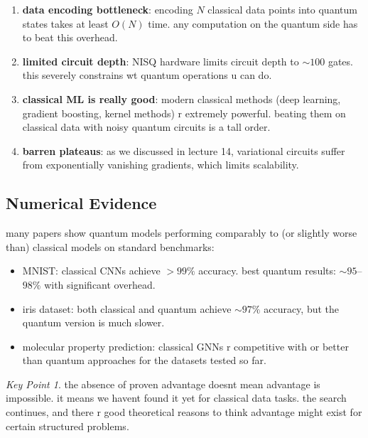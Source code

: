 \documentclass[11pt,a4paper]{article}
\theoremstyle{definition}
\theoremstyle{remark}
\newtheorem*{keypoint}{Key Point}
\begin{document}
\begin{enumerate}[label=\arabic*.]
    \item \textbf{data encoding bottleneck}: encoding $N$ classical data points into quantum states takes at least $O(N)$ time. any computation on the quantum side has to beat this overhead.

    \item \textbf{limited circuit depth}: NISQ hardware limits circuit depth to $\sim 100$ gates. this severely constrains wt quantum operations u can do.

    \item \textbf{classical ML is really good}: modern classical methods (deep learning, gradient boosting, kernel methods) r extremely powerful. beating them on classical data with noisy quantum circuits is a tall order.

    \item \textbf{barren plateaus}: as we discussed in lecture 14, variational circuits suffer from exponentially vanishing gradients, which limits scalability.
\end{enumerate}

\subsection{Numerical Evidence}

many papers show quantum models performing comparably to (or slightly worse than) classical models on standard benchmarks:
\begin{itemize}[nosep]
    \item MNIST: classical CNNs achieve $>99\%$ accuracy. best quantum results: $\sim 95$--$98\%$ with significant overhead.
    \item iris dataset: both classical and quantum achieve $\sim 97\%$ accuracy, but the quantum version is much slower.
    \item molecular property prediction: classical GNNs r competitive with or better than quantum approaches for the datasets tested so far.
\end{itemize}

\begin{keypoint}
the absence of proven advantage doesnt mean advantage is impossible. it means we havent found it yet for classical data tasks. the search continues, and there r good theoretical reasons to think advantage might exist for certain structured problems.
\end{keypoint}
\end{document}
